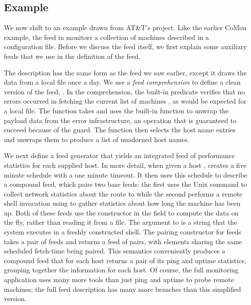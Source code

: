 \subsection{\vizGems{} Example}
We now shift to an example drawn from AT\&T's \vizGems{} project.  Like
the earlier CoMon example, the  feed in 
monitors a collection of machines described in a configuration file.
Before we discuss the  feed itself, we first explain some
auxiliary feeds that we use in the definition of the  feed.   

The  description has the same form as the 
feed we saw earlier, except it draws the data from a local file once a
day.  We use a \textit{feed comprehension} to define a clean
version of the feed, .  In the comprehension, the
built-in predicate  verifies that no errors occurred in
fetching the current list of machines , as would be expected
for a local file.  The function  takes  and uses
the built-in function  to unwrap the payload data from
the error infrastructure, an operation that is guaranteed to succeed
because of the  guard. The function  then
selects the host name entries and unwraps them to produce a list of
unadorned host names.   

We next define a feed generator  that yields an
integrated feed of performance statistics for each supplied host.  In
more detail, when given a host ,  creates a five
minute schedule with a one minute timeout. It then uses this schedule
to describe a compound feed, which pairs two base feeds: the first
uses the Unix command  to collect network statistics about
the route to  while the second performs a remote shell
invocation using  to gather statistics about how long the
machine has been up.  Both of these feeds use the 
constructor in the  field to compute the data on the fly,
rather than reading it from a file.  The argument to  is a
string that the system executes in a freshly constructed shell.  The
pairing constructor for feeds takes a pair of feeds and returns a feed
of pairs, with elements sharing the same scheduled fetch-time being
paired. This semantics conveniently produces a compound feed that for
each host returns a pair of its ping and uptime statistics, grouping
together the information for each host.  Of course, the full
\vizGems{} monitoring application uses many more tools than just ping
and uptime to probe remote machines; the full feed description has
many more branches than this simplified version. 


